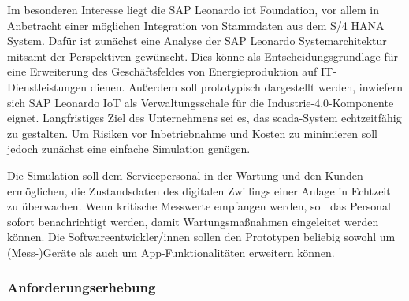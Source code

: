 \noindent Im besonderen Interesse liegt die SAP Leonardo \ac{iot} Foundation, vor allem in Anbetracht einer möglichen Integration von Stammdaten aus dem S/4 HANA System. Dafür ist zunächst eine Analyse der SAP Leonardo Systemarchitektur mitsamt der Perspektiven gewünscht. Dies könne als Entscheidungsgrundlage für eine Erweiterung des Geschäftsfeldes von Energieproduktion auf IT-Dienstleistungen dienen. Außerdem soll prototypisch dargestellt werden, inwiefern sich SAP Leonardo IoT als Verwaltungsschale für die Industrie-4.0-Komponente eignet. Langfristiges Ziel des Unternehmens sei es, das \ac{scada}-System echtzeitfähig zu gestalten. Um Risiken vor Inbetriebnahme und Kosten zu minimieren soll jedoch zunächst eine einfache Simulation genügen.

\noindent Die Simulation soll dem Servicepersonal in der Wartung und den Kunden ermöglichen, die Zustandsdaten des digitalen Zwillings einer Anlage in Echtzeit zu überwachen. Wenn kritische Messwerte empfangen werden, soll das Personal sofort benachrichtigt werden, damit Wartungsmaßnahmen eingeleitet werden können. Die Softwareentwickler/innen sollen den Prototypen beliebig sowohl um (Mess-)Geräte als auch um App-Funktionalitäten erweitern können.

\subsubsection{Anforderungserhebung}

